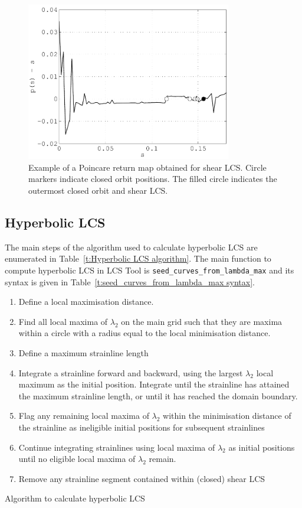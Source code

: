 \documentclass{article}
\begin{document}
\begin{figure}
\begin{center}
\includegraphics[width=0.8\textwidth]{graphics/double_gyre/poincare_return_map}
\end{center}
\caption{Example of a Poincare return map obtained for shear LCS. Circle markers indicate closed orbit positions. The filled circle indicates the outermost closed orbit and shear LCS.}
\label{f:Poincare return map}
\end{figure}

\subsection{Hyperbolic LCS}

The main steps of the algorithm used to calculate hyperbolic LCS are enumerated in Table~\ref{t:Hyperbolic LCS algorithm}. The main function to compute hyperbolic LCS in LCS Tool is \lstinline!seed_curves_from_lambda_max! and its syntax is given in Table~\ref{t:seed_curves_from_lambda_max syntax}.

\begin{table}
\begin{enumerate}
\item Define a local maximisation distance.
\item Find all local maxima of $\lambda_2$ on the main grid such that they are maxima within a circle with a radius equal to the local minimisation distance.
\item Define a maximum strainline length
\item Integrate a strainline forward and backward, using the largest $\lambda_2$ local maximum as the initial position. Integrate until the strainline has attained the maximum strainline length, or until it has reached the domain boundary.
\item Flag any remaining local maxima of $\lambda_2$ within the minimisation distance of the strainline as ineligible initial positions for subsequent strainlines
\item Continue integrating strainlines using local maxima of $\lambda_2$ as initial positions until no eligible local maxima of $\lambda_2$ remain.
\item Remove any strainline segment contained within (closed) shear LCS
\end{enumerate}
\caption{Algorithm to calculate hyperbolic LCS}
\label{t:Hyperbolic LCS algorithm}
\end{table}
\end{document}
